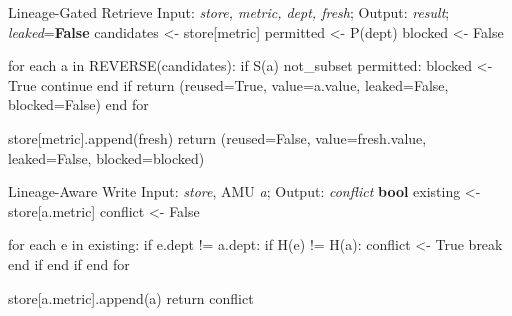 \documentclass[nolineno]{ieeeaccess}
\begin{document}
\begin{algorithmbox}[label={alg:retrieve}]{Lineage-Gated Retrieve}{%
  \textnormal{Input: \textit{store, metric, dept, fresh}; Output: \textit{result}; \textit{leaked}=\textbf{False}}}
candidates <- store[metric]         %
permitted  <- P(dept)               %
blocked    <- False

for each a in REVERSE(candidates):  %
  if S(a) not_subset permitted:     %
    blocked <- True
    continue                        %
  end if
  return (reused=True, value=a.value, leaked=False, blocked=False)
end for

store[metric].append(fresh)
return (reused=False, value=fresh.value, leaked=False, blocked=blocked)
\end{algorithmbox}

\begin{algorithmbox}[label={alg:write}]{Lineage-Aware Write}{%
  \textnormal{Input: \textit{store}, AMU \textit{a}; Output: \textit{conflict} \textbf{bool}}}
existing <- store[a.metric]   %
conflict <- False

for each e in existing:
  if e.dept != a.dept:        %
    if H(e) != H(a):          %
      conflict <- True
      break
    end if
  end if
end for

store[a.metric].append(a)     %
return conflict
\end{algorithmbox}
\end{document}
